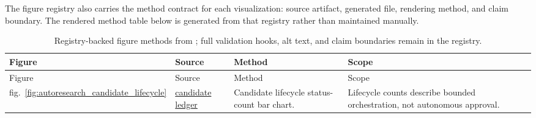 \documentclass[
]{article}
\begin{document}
The figure registry also carries the method contract for each
visualization: source artifact, generated file, rendering method, and
claim boundary. The rendered method table below is generated from that
registry rather than maintained manually.

\begingroup\footnotesize

\begin{longtable}[]{@{}
  >{\raggedright\arraybackslash}p{}
  >{\raggedright\arraybackslash}p{}
  >{\raggedright\arraybackslash}p{}
  >{\raggedright\arraybackslash}p{}@{}}
\caption{Registry-backed figure methods from
\href{../figures/figure_registry.json}{\protect{}};
full validation hooks, alt text, and claim boundaries remain in the
registry.}\label{tbl:figure-methods}\tabularnewline
\toprule\noalign{}
\begin{minipage}[b]{\linewidth}\raggedright
Figure
\end{minipage} & \begin{minipage}[b]{\linewidth}\raggedright
Source
\end{minipage} & \begin{minipage}[b]{\linewidth}\raggedright
Method
\end{minipage} & \begin{minipage}[b]{\linewidth}\raggedright
Scope
\end{minipage} \\
\midrule\noalign{}
\endfirsthead
\toprule\noalign{}
\begin{minipage}[b]{\linewidth}\raggedright
Figure
\end{minipage} & \begin{minipage}[b]{\linewidth}\raggedright
Source
\end{minipage} & \begin{minipage}[b]{\linewidth}\raggedright
Method
\end{minipage} & \begin{minipage}[b]{\linewidth}\raggedright
Scope
\end{minipage} \\
\midrule\noalign{}
\endhead
\bottomrule\noalign{}
\endlastfoot
fig.~\ref{fig:autoresearch_candidate_lifecycle} &
\href{../data/ml_candidate_ledger.json}{candidate ledger} & Candidate
lifecycle status-count bar chart. & Lifecycle counts describe bounded
orchestration, not autonomous approval. \\

\end{longtable}
\end{document}
